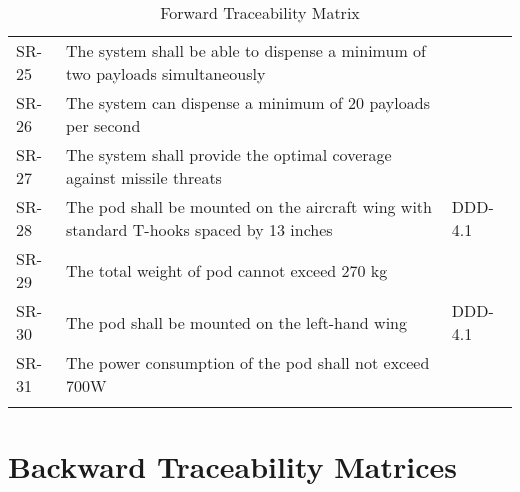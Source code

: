 \documentclass[Main]{subfiles}
\begin{document}
\begin{longtable}{p{} p{} p{}}
SR-25 & The system shall be able to dispense a minimum of two payloads simultaneously  &  \\

SR-26 & The system can dispense a minimum of 20 payloads per second &  \\

SR-27 & The system shall provide the optimal coverage against	missile threats &  \\

SR-28 & The pod shall be mounted on the aircraft wing with standard T-hooks spaced by 13 inches & DDD-4.1 \\

SR-29 & The total weight of pod cannot exceed 270 kg  &  \\

SR-30 & The pod shall be mounted on the left-hand wing & DDD-4.1 \\

SR-31 & The power consumption of the pod shall not exceed 700W &  \\\hline

\caption{Forward Traceability Matrix}
\label{Tab:Forward}
\end{longtable}






\newpage
\section{Backward Traceability Matrices}
\end{document}
